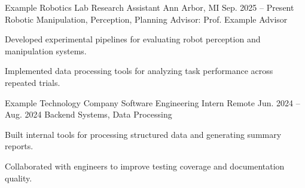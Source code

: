 
\VectraExperienceEntry
    {Example Robotics Lab}
    {Research Assistant}
    {Ann Arbor, MI}
    {Sep. 2025 -- Present}
    {Robotic Manipulation, Perception, Planning}
    {Advisor: Prof. Example Advisor}
    {
        \item Developed experimental pipelines for evaluating robot perception and manipulation systems.
        \item Implemented data processing tools for analyzing task performance across repeated trials.
    }

\VectraExperienceEntry
    {Example Technology Company}
    {Software Engineering Intern}
    {Remote}
    {Jun. 2024 -- Aug. 2024}
    {Backend Systems, Data Processing}
    {}
    {
        \item Built internal tools for processing structured data and generating summary reports.
        \item Collaborated with engineers to improve testing coverage and documentation quality.
    }
